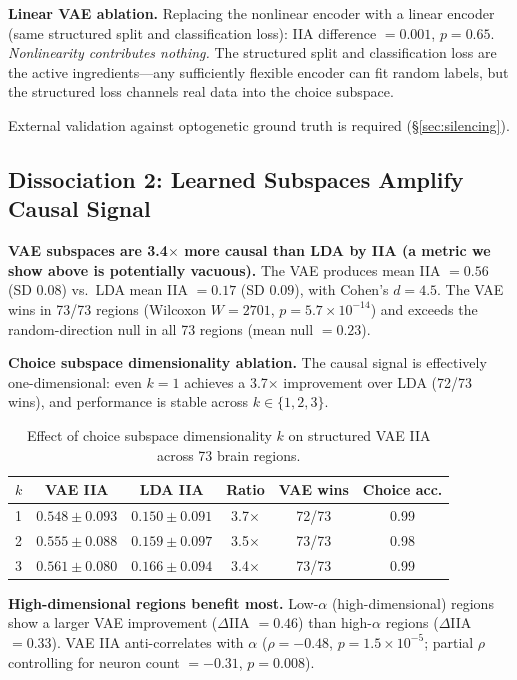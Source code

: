 \documentclass{article}
\begin{document}
\textbf{Linear VAE ablation.} Replacing the nonlinear encoder with a linear encoder (same structured split and classification loss): IIA difference $= 0.001$, $p = 0.65$. \emph{Nonlinearity contributes nothing.} The structured split and classification loss are the active ingredients---any sufficiently flexible encoder can fit random labels, but the structured loss channels real data into the choice subspace.

External validation against optogenetic ground truth is required (\S\ref{sec:silencing}).


\subsection{Dissociation 2: Learned Subspaces Amplify Causal Signal}
\label{sec:amplify}

\textbf{VAE subspaces are 3.4$\times$ more causal than LDA by IIA (a metric we show above is potentially vacuous).} The VAE produces mean IIA $= 0.56$ (SD $0.08$) vs.\ LDA mean IIA $= 0.17$ (SD $0.09$), with Cohen's $d = 4.5$. The VAE wins in 73/73 regions (Wilcoxon $W = 2701$, $p = 5.7 \times 10^{-14}$) and exceeds the random-direction null in all 73 regions (mean null $= 0.23$).

\textbf{Choice subspace dimensionality ablation.} The causal signal is effectively one-dimensional: even $k = 1$ achieves a 3.7$\times$ improvement over LDA (72/73 wins), and performance is stable across $k \in \{1, 2, 3\}$.

\begin{table}[h]
\centering
\small
\caption{Effect of choice subspace dimensionality $k$ on structured VAE IIA across 73 brain regions.}
\label{tab:vae_k_ablation}
\begin{tabular}{lccccc}
\toprule
$k$ & VAE IIA & LDA IIA & Ratio & VAE wins & Choice acc. \\
\midrule
1 & $0.548 \pm 0.093$ & $0.150 \pm 0.091$ & 3.7$\times$ & 72/73 & 0.99 \\
2 & $0.555 \pm 0.088$ & $0.159 \pm 0.097$ & 3.5$\times$ & 73/73 & 0.98 \\
3 & $0.561 \pm 0.080$ & $0.166 \pm 0.094$ & 3.4$\times$ & 73/73 & 0.99 \\
\bottomrule
\end{tabular}
\end{table}

\textbf{High-dimensional regions benefit most.} Low-$\alpha$ (high-dimensional) regions show a larger VAE improvement ($\Delta$IIA $= 0.46$) than high-$\alpha$ regions ($\Delta$IIA $= 0.33$). VAE IIA anti-correlates with $\alpha$ ($\rho = -0.48$, $p = 1.5 \times 10^{-5}$; partial $\rho$ controlling for neuron count $= -0.31$, $p = 0.008$).
\end{document}
